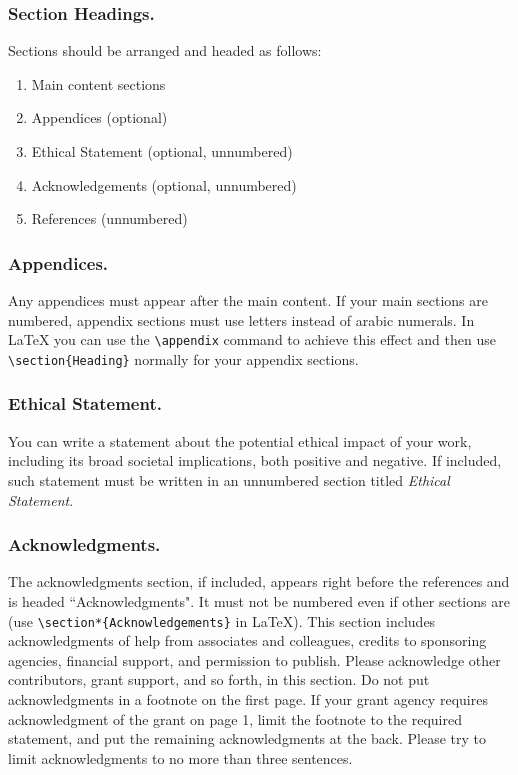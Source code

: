 \subsubsection{Section Headings.}
Sections should be arranged and headed as follows:
\begin{enumerate}
\item Main content sections
\item Appendices (optional)
\item Ethical Statement (optional, unnumbered)
\item Acknowledgements (optional, unnumbered)
\item References (unnumbered)
\end{enumerate}

\subsubsection{Appendices.}
Any appendices must appear after the main content. If your main sections are numbered, appendix sections must use letters instead of arabic numerals. In \LaTeX{} you can use the \texttt{\textbackslash appendix} command to achieve this effect and then use \texttt{\textbackslash section\{Heading\}} normally for your appendix sections.

\subsubsection{Ethical Statement.}
You can write a statement about the potential ethical impact of your work, including its broad societal implications, both positive and negative. If included, such statement must be written in an unnumbered section titled \emph{Ethical Statement}.

\subsubsection{Acknowledgments.}
The acknowledgments section, if included, appears right before the references and is headed ``Acknowledgments". It must not be numbered even if other sections are (use \texttt{\textbackslash section*\{Acknowledgements\}} in \LaTeX{}). This section includes acknowledgments of help from associates and colleagues, credits to sponsoring agencies, financial support, and permission to publish. Please acknowledge other contributors, grant support, and so forth, in this section. Do not put acknowledgments in a footnote on the first page. If your grant agency requires acknowledgment of the grant on page 1, limit the footnote to the required statement, and put the remaining acknowledgments at the back. Please try to limit acknowledgments to no more than three sentences.


